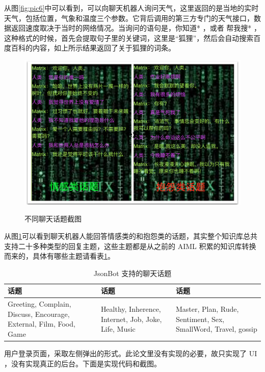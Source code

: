 \documentclass[bachelor,winfonts]{jnuthesis}
\begin{document}
从图\ref{fig:pic6}中可以看到，可以向聊天机器人询问天气，这里返回的是当地的实时天气，包括位置，气象和温度三个参数。它背后调用的第三方专门的天气接口，数据返回速度取决于当时的网络情况。当询问的语句是，你知道* ，或者 帮我搜* ，这种格式的时候，首先会提取句子里的关键词，这里是“狐狸”，然后会自动搜索百度百科的内容，如上所示结果返回了关于狐狸的词条。

\begin{figure}[H]
  \centering
  \includegraphics[width= 1.0\textwidth]{chattopic.png}\\
  \caption{不同聊天话题截图}\label{fig:pic7}
\end{figure}

从图\ref{fig:pic7}可以看到聊天机器人能回答情感类的和抱怨类的话题，其实整个知识库总共支持二十多种类型的回复主题，这些主题都是从之前的 AIML 积累的知识库转换而来的，具体有哪些主题请看表\ref{table:t3}。

\begin{table}[H]
  \centering
  \begin{tabular}{p{38mm}p{38mm}p{38mm}}
    \toprule
    \textbf{话题} & \textbf{话题} & \textbf{话题}\\
    \midrule
    Greeting, Complain, Discuss, Encourage, External, Film, Food, Game & Healthy, Inherence, Internet, Job, Joke, Life, Music & Master, Plan, Rude, Sentiment, Sex, SmallWord, Travel, gossip\\
    \bottomrule
  \end{tabular}
  \caption{JsonBot 支持的聊天话题}\label{table:t3}
\end{table}


用户登录页面，采取左侧弹出的形式。此论文里没有实现的必要，故只实现了 UI ，没有实现真正的后台。下面是实现代码和截图。
\end{document}
